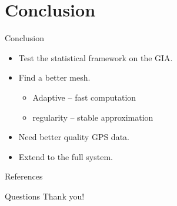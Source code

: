 \documentclass{beamer}
\begin{document}
\section{Conclusion}
\begin{frame}{Conclusion}

\begin{itemize}
\item Test the statistical framework on the GIA.
\item Find a better mesh.
\begin{itemize}
\item Adaptive -- fast computation
\item regularity -- stable approximation
\end{itemize}
\item Need better quality GPS data.
\item Extend to the full system.
\end{itemize}


\end{frame}

\begin{frame}{References}

\small{}
\end{frame}


\begin{frame}{Questions}
\centering
\Huge
Thank you!
\end{frame}
\end{document}
